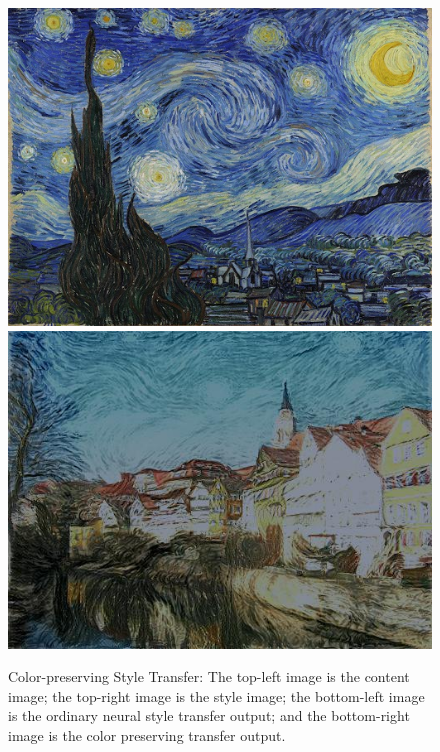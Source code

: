 \documentclass[runningheads]{llncs}
\begin{document}
\begin{figure}[h!]
{\begin{minipage}[b]{0.4\textwidth}
\includegraphics[width=1\textwidth]{neural_style_transfer/img/styles/starry-night.jpg} \\
\includegraphics[width=1\textwidth]{neural_style_transfer/img/color_preserve/ret_yuv.jpg}
\end{minipage}
}
\caption{Color-preserving Style Transfer: The top-left image is the content image; the top-right image is the style image; the bottom-left image is the ordinary neural style transfer output; and the bottom-right image is the color preserving transfer output.}
\label{fig:preserve}
\end{figure}
\end{document}
